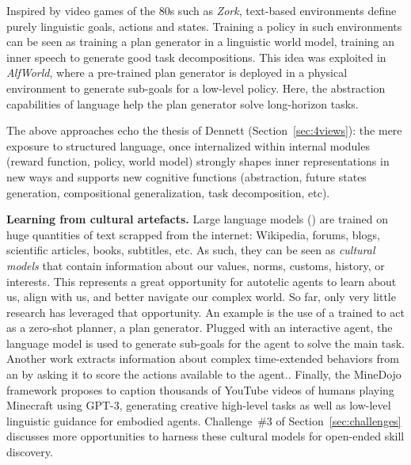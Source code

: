 Inspired by video games of the 80s such as \textit{Zork}, text-based environments define purely linguistic goals, actions and states.\cite{cote_textworld_2018, das_embodied_2018, yuan_interactive_2019} Training a policy in such environments can be seen as training a plan generator in a linguistic world model, \ie training an inner speech to generate good task decompositions. This idea was exploited in \textit{AlfWorld}, where a pre-trained plan generator is deployed in a physical environment to generate sub-goals for a low-level policy.\cite{shridhar_alfworld_2021} Here, the abstraction capabilities of language help the plan generator solve long-horizon tasks.

The above approaches echo the thesis of Dennett (Section~\ref{sec:4views}): the mere exposure to structured language, once internalized within internal modules (reward function, policy, world model) strongly shapes inner representations in new ways and supports new cognitive functions (abstraction, future states generation, compositional generalization, task decomposition, etc).

\textbf{Learning from cultural artefacts.} Large language models (\llm) are trained on huge quantities of text scrapped from the internet: Wikipedia, forums, blogs, scientific articles, books, subtitles, etc.\cite{devlin2019bert,brown2020language} As such, they can be seen as \textit{cultural models} that contain information about our values, norms, customs, history, or interests.\cite{hershcovich_challenges_2022,arora2022probing} This represents a great opportunity for autotelic agents to learn about us, align with us, and better navigate our complex world. So far, only very little research has leveraged that opportunity. An example is the use of a trained \llm to act as a zero-shot planner, \ie a plan generator.\cite{huang2022language} Plugged with an interactive agent, the language model is used to generate sub-goals for the agent to solve the main task. Another work extracts information about complex time-extended behaviors from an \llm by asking it to score the actions available to the agent.\cite{ahn2022doasican}. Finally, the MineDojo framework\cite{fan2022minedojo} proposes to caption thousands of YouTube videos of humans playing Minecraft using GPT-3\cite{brown2020language}, generating creative high-level tasks as well as low-level linguistic guidance for embodied agents. Challenge~\#3 of Section~\ref{sec:challenges}  discusses more opportunities to harness these cultural models for open-ended skill discovery. 

